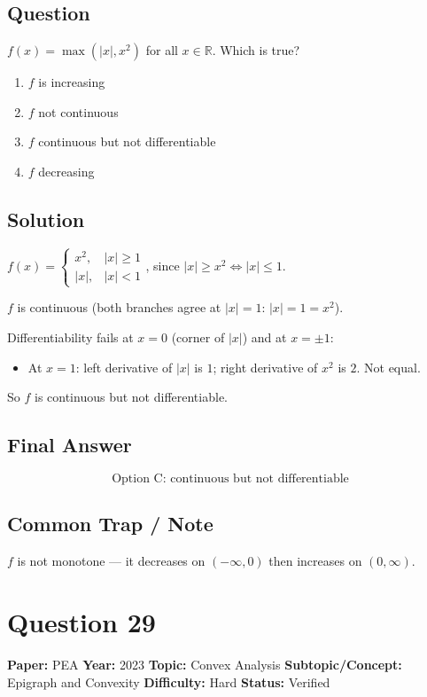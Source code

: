 \documentclass[11pt]{article}
\begin{document}
\subsection*{Question}
$f(x)=\max(|x|,x^2)$ for all $x\in\mathbb R$. Which is true?
\begin{enumerate}[label=(\Alph*)]
\item $f$ is increasing \item $f$ not continuous \item $f$ continuous but not differentiable \item $f$ decreasing
\end{enumerate}

\subsection*{Solution}
$f(x)=\begin{cases}x^2,& |x|\ge 1\\ |x|,& |x|<1\end{cases}$, since $|x|\ge x^2\iff |x|\le 1$.

$f$ is continuous (both branches agree at $|x|=1$: $|x|=1=x^2$).

Differentiability fails at $x=0$ (corner of $|x|$) and at $x=\pm 1$:
\begin{itemize}[leftmargin=*,nosep]
\item At $x=1$: left derivative of $|x|$ is $1$; right derivative of $x^2$ is $2$. Not equal.
\end{itemize}
So $f$ is continuous but not differentiable.

\subsection*{Final Answer}
\[
\boxed{\text{Option C: continuous but not differentiable}}
\]

\subsection*{Common Trap / Note}
$f$ is not monotone --- it decreases on $(-\infty,0)$ then increases on $(0,\infty)$.

\medskip

\section*{Question 29}
\textbf{Paper:} PEA \quad \textbf{Year:} 2023 \quad \textbf{Topic:} Convex Analysis \quad \textbf{Subtopic/Concept:} Epigraph and Convexity \quad \textbf{Difficulty:} Hard \quad \textbf{Status:} Verified
\end{document}
